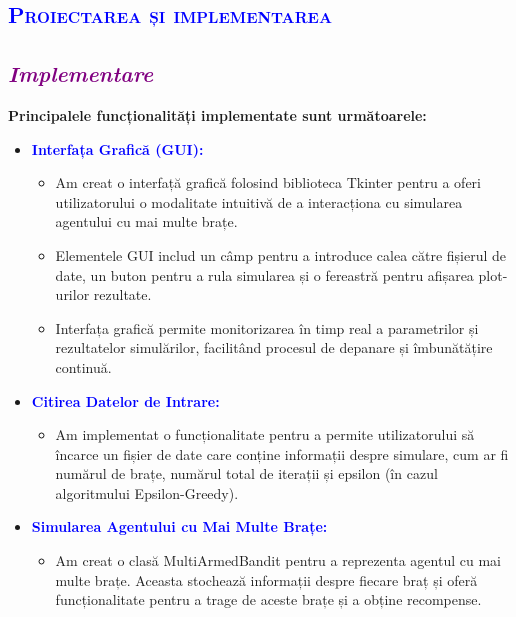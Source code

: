 \documentclass{article}
\begin{document}
\begin{center}
	\textcolor{blue}{\section{\bfseries\scshape\textcolor{blue}{ Proiectarea și implementarea}}}
\end{center}
\textcolor{purple}{\subsection{\itshape \textcolor{purple}{Implementare}}}
\textbf{Principalele funcționalități implementate sunt următoarele:}
\begin{itemize}
\item\textbf{\textcolor{blue}{Interfața Grafică (GUI): }} \vspace{2mm}
\begin{itemize}
      \item  Am creat o interfață grafică folosind biblioteca Tkinter pentru a oferi utilizatorului o modalitate intuitivă de a interacționa cu simularea agentului cu mai multe brațe.\vspace{2mm}
      \item  Elementele GUI includ un câmp pentru a introduce calea către fișierul de date, un buton pentru a rula simularea și o fereastră pentru afișarea plot-urilor rezultate.\vspace{2mm}
      \item  Interfața grafică permite monitorizarea în timp real a parametrilor și rezultatelor simulărilor, facilitând procesul de depanare și îmbunătățire continuă.\vspace{2mm}
\end{itemize}

\item\textbf{\textcolor{blue}{Citirea Datelor de Intrare: }} \vspace{2mm}
\begin{itemize}
      \item  Am implementat o funcționalitate pentru a permite utilizatorului să încarce un fișier de date care conține informații despre simulare, cum ar fi numărul de brațe, numărul total de iterații și epsilon (în cazul algoritmului Epsilon-Greedy).\vspace{2mm}
\end{itemize}

\item\textbf{\textcolor{blue}{Simularea Agentului cu Mai Multe Brațe:}} \vspace{2mm}
\begin{itemize}
      \item Am creat o clasă MultiArmedBandit pentru a reprezenta agentul cu mai multe brațe. Aceasta stochează informații despre fiecare braț și oferă funcționalitate pentru a trage de aceste brațe și a obține recompense.\vspace{2mm}
\end{itemize}


\end{itemize}
\end{document}

